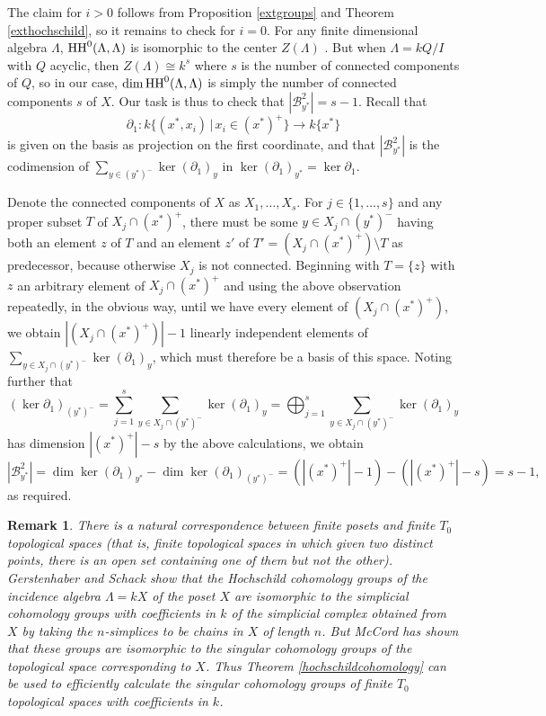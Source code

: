\documentclass[preprint,review,12pt]{elsarticle}
\newcommand{\HH}{{\textnormal{HH}}}
\newcommand{\B}{{\mathcal B}}
\newtheorem{obs}[deft]{Remark}
\begin{document}
\begin{pf}
The claim for $i>0$ follows from Proposition \ref{extgroups} and Theorem \ref{exthochschild}, so it remains to check for $i=0$. For any finite dimensional algebra $\Lambda$, $\HH^0(\Lambda,\Lambda)$ is isomorphic to the center $Z(\Lambda)$ \cite[p.9]{W19}.  But when $\Lambda = kQ/I$ with $Q$ acyclic, then $Z(\Lambda)\cong k^s$ where $s$ is the number of connected components of $Q$, so in our case, $\dim\HH^0(\Lambda, \Lambda)$ is simply the number of connected components $s$ of $X$.  Our task is thus to check that $|\B^{2}_{y^*}| = s-1$.  Recall that
	$$\partial_1 : k\{ (x^*,x_i)\,|\,x_i\in (x^*)^+\} \to k\{ x^*\}$$
is given on the basis as projection on the first coordinate, and that $|\B^{2}_{y^*}|$ is the codimension of $\sum_{y\in (y^*)^-}\ker (\partial_1)_y$ in $\ker (\partial_1)_{y^*} = \ker \partial_1$.  

Denote the connected components of $X$ as $X_1, \hdots, X_s$.  For $j\in \{1, \hdots, s\}$ and any proper subset $T$ of $X_j\cap (x^*)^+$, there must be some $y\in X_j\cap (y^*)^-$ having both an element $z$ of $T$ and an element $z'$ of $T' = (X_j\cap (x^*)^+)\setminus T$ as predecessor, because otherwise $X_j$ is not connected.  Beginning with $T = \{z\}$ with $z$ an arbitrary element of $X_j\cap (x^*)^+$ and using the above observation repeatedly, in the obvious way, until we have every element of $(X_j\cap (x^*)^+)$, we obtain $|(X_j\cap (x^*)^+)|-1$ linearly independent elements of $\sum_{y\in X_j\cap (y^*)^-}\ker(\partial_1)_y$, which must therefore be a basis of this space.  Noting further that
	$$(\ker \partial_1)_{(y^*)^-} = \sum_{j=1}^s
    \sum_{y\in X_j\cap (y^*)^-}\ker(\partial_1)_y =
    \bigoplus_{j=1}^s  
    \sum_{y\in X_j\cap (y^*)^-}\ker(\partial_1)_y
    $$
has dimension $|(x^*)^+|-s$ by the above calculations, we obtain
	$$|\B^{2}_{y^*}| = \dim \ker(\partial_1)_{y^*} - \dim \ker(\partial_1)_{(y^*)^-} = (|(x^*)^+| - 1) - (|(x^*)^+|-s) = s-1,$$
as required.
\end{pf}
\begin{obs}\label{obs top spaces}
There is a natural correspondence between finite posets and finite $T_0$ topological spaces (that is, finite topological spaces in which given two distinct points, there is an open set containing one of them but not the other).  Gerstenhaber and Schack \cite[p.148]{GS83} show that the Hochschild cohomology groups of the incidence algebra $\Lambda = kX$ of the poset $X$ are isomorphic to the simplicial cohomology groups with coefficients in $k$ of the simplicial complex obtained from $X$ by taking the $n$-simplices to be chains in $X$ of length $n$.  But McCord \cite[Theorem 1]{M66} has shown that these groups are isomorphic to the singular cohomology groups of the topological space corresponding to $X$. Thus Theorem \ref{hochschildcohomology} can be used to efficiently calculate the singular cohomology groups of finite $T_0$ topological spaces with coefficients in $k$.
\end{obs}
\end{document}
